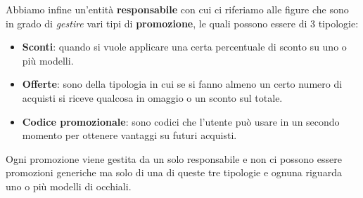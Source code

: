 Abbiamo infine un'entità \textbf{responsabile} con cui ci riferiamo alle figure che sono in
grado di \emph{gestire} vari tipi di \textbf{promozione}, le quali possono essere di 3 tipologie:
\begin{itemize}
	\item \textbf{Sconti}: quando si vuole applicare una certa percentuale di sconto su uno o più
	      modelli.
	\item \textbf{Offerte}: sono della tipologia in cui se si fanno almeno un certo numero di
	      acquisti si riceve qualcosa in omaggio o un sconto sul totale.
	\item \textbf{Codice promozionale}: sono codici che l'utente può usare in un secondo momento
	      per ottenere vantaggi su futuri acquisti.
\end{itemize}
Ogni promozione viene gestita da un solo responsabile e non ci possono essere promozioni generiche
ma solo di una di queste tre tipologie e ognuna riguarda uno o più modelli di occhiali.
